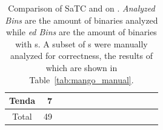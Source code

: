 \begin{table}[tb]
{\begin{tabular}{cr:rrrrrr:rrrrrr}
			Tenda                   & 7                             &
			\satcCompTendaAlerts    & \satcCompTendaCmdInjAlerts    & \satcCompTendaOverflowAlerts        & \satcCompTendaTime                      & \satcCompTendaAnalyzedBins    & \satcCompTendaAlertedBins    &
			\mangoCompTendaAlerts   & \mangoCompTendaCmdInjAlerts   & \mangoCompTendaOverflowAlerts       & \mangoCompTendaTime                     & \mangoCompTendaAnalyzedBins   & \mangoCompTendaAlertedBins                           \\
			\hline
			Total                   & 49                            &
			\satcCompTotalAlerts    & \satcCompTotalCmdInjAlerts    & \satcCompTotalOverflowAlerts        & \satcCompTotalTime                      & \satcCompTotalAnalyzedBins    & \satcCompTotalAlertedBins    &
			\mangoCompTotalAlerts   & \mangoCompTotalCmdInjAlerts   & \mangoCompTotalOverflowAlerts       & \mangoCompTotalTime                     & \mangoCompTotalAnalyzedBins   & \mangoCompTotalAlertedBins                           \\
			\hline
		\end{tabular}
	}
	\caption{Comparison of SaTC and \toolname on \karonteDataset.
		\textit{Analyzed Bins} are the amount of binaries \toolname analyzed while \textit{\trupoc{}ed Bins} are the amount of binaries with \trupoc{}s.
		A subset of \trupoc{}s were manually analyzed for correctness, the results of which are shown in Table~\ref{tab:mango_manual}. \\
	}
	\label{tab:mango_satc}
\end{table}
